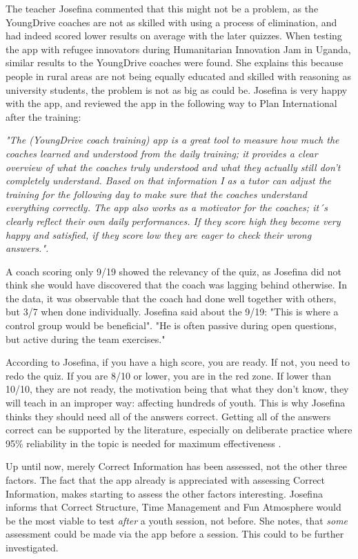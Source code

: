     The teacher Josefina commented that this might not be a problem, as the YoungDrive coaches are not as skilled with using a process of elimination, and had indeed scored lower results on average with the later quizzes. When testing the app with refugee innovators during Humanitarian Innovation Jam in Uganda, similar results to the YoungDrive coaches were found. She explains this because people in rural areas are not being equally educated and skilled with reasoning as university students, the problem is not as big as could be. Josefina is very happy with the app, and reviewed the app in the following way to Plan International after the training:

\textit{"The (YoungDrive coach training) app is a great tool to measure how much the coaches learned and understood from the daily training; it provides a clear overview of what the coaches truly understood and what they actually still don’t completely understand. Based on that information I as a tutor can adjust the training for the following day to make sure that the coaches understand everything correctly. The app also works as a motivator for the coaches; it´s clearly reflect their own daily performances. If they score high they become very happy and satisfied, if they score low they are eager to check their wrong answers.".}

A coach scoring only 9/19 showed the relevancy of the quiz, as Josefina did not think she would have discovered that the coach was lagging behind otherwise. In the data, it was observable that the coach had done well together with others, but 3/7 when done individually. Josefina said about the 9/19: "This is where a control group would be beneficial". "He is often passive during open questions, but active during the team exercises."

According to Josefina, if you have a high score, you are ready. If not, you need to redo the quiz. If you are 8/10 or lower, you are in the red zone. If lower than 10/10, they are not ready, the motivation being that what they don't know, they will teach in an improper way: affecting hundreds of youth. This is why Josefina thinks they should need all of the answers correct. Getting all of the answers correct can be supported by the literature, especially on deliberate practice where 95\% reliability in the topic is needed for maximum effectiveness \citep{sierra}.

Up until now, merely Correct Information has been assessed, not the other three factors. The fact that the app already is appreciated with assessing Correct Information, makes starting to assess the other factors interesting. Josefina informs that Correct Structure, Time Management and Fun Atmosphere would be the most viable to test \textit{after} a youth session, not before. She notes, that \textit{some} assessment could be made via the app before a session. This could to be further investigated.


